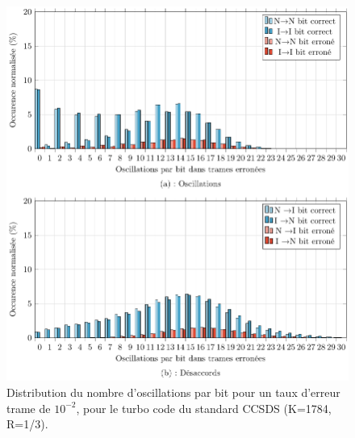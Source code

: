 \begin{figure}[!ht]
	\centering
	\includegraphics[width=\textwidth]{main/ch2_fig/tikz/d_ccsds_10-2.pdf}
	\caption{Distribution du nombre d'oscillations par bit pour un taux d'erreur trame de $10^{-2}$, pour le turbo code du standard CCSDS (K=1784, R=1/3).\label{fig:d1_ccsds}}
\end{figure}

